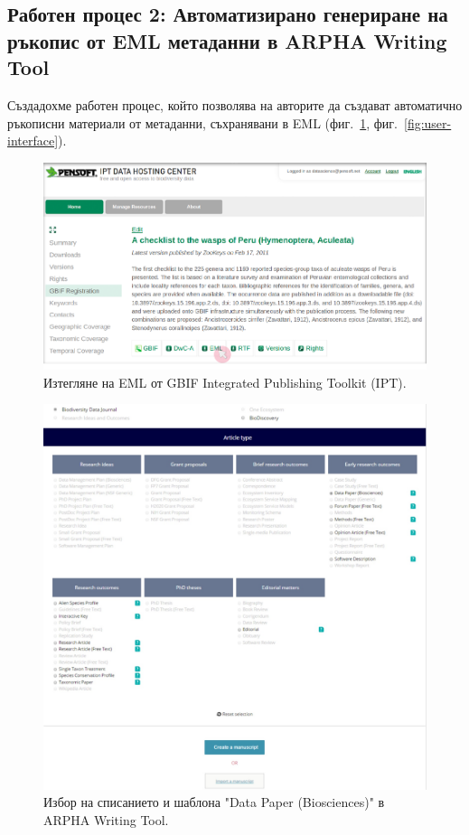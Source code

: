 \subsection {Работен процес 2: Автоматизирано генериране на ръкопис от EML метаданни в ARPHA Writing Tool}

Създадохме работен процес, който позволява на авторите да създават автоматично ръкописни материали от метаданни, съхранявани в EML (фиг.~\ref{fig:EML-download}, фиг.~\ref{fig:user-interface}).
\begin{figure}
\centering
\includegraphics[width=\textwidth]{Figures/EML-download}
\decoRule
\caption{Изтегляне на EML от GBIF Integrated Publishing Toolkit (IPT).}
\label{fig:EML-download}
\end{figure}

\begin{figure}
\centering
\includegraphics[width=\textwidth]{Figures/journal-selection}
\decoRule
\caption{Избор на списанието и шаблона "Data Paper (Biosciences)" в ARPHA Writing Tool.}
\label{fig:journal-selection}
\end{figure}

